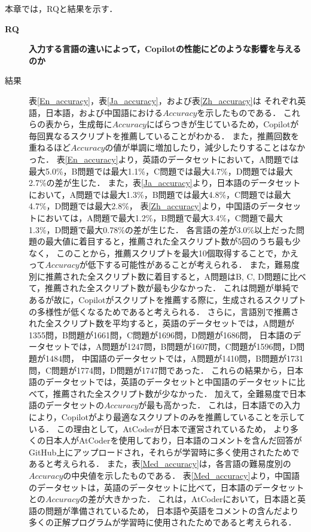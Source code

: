   本章では，RQと結果を示す．
  \begin{description}
    \item[\textbf{RQ}] \textbf{入力する言語の違いによって，Copilotの性能にどのような影響を与えるのか}
      \item[結果]
      
      表\ref{En_accuracy}，表\ref{Ja_accuracy}，および表\ref{Zh_accuracy}は
      それぞれ英語，日本語，および中国語における$Accuracy$を示したものである．
      これらの表から，生成毎に$Accuracy$にばらつきが生じているため，Copilotが毎回異なるスクリプトを推薦していることがわかる．
      また，推薦回数を重ねるほど$Accuracy$の値が単調に増加したり，減少したりすることはなかった．
      表\ref{En_accuracy}より，英語のデータセットにおいて，A問題では最大5.0\%，B問題では最大1.1\%，C問題では最大4.7\%，D問題では最大2.7\%の差が生じた．
      また，表\ref{Ja_accuracy}より，日本語のデータセットにおいて，A問題では最大1.3\%，B問題では最大4.8\%，C問題では最大4.7\%，D問題では最大2.8\%，
      表\ref{Zh_accuracy}より，中国語のデータセットにおいては，A問題で最大1.2\%，B問題で最大3.4\%，C問題で最大1.3\%，D問題で最大0.78\%の差が生じた．
      各言語の差が3.0\%以上だった問題の最大値に着目すると，推薦された全スクリプト数が5回のうち最も少なく，
      このことから，推薦スクリプトを最大10個取得することで，かえって$Accuracy$が低下する可能性があることが考えられる．
      また，難易度別に推薦された全スクリプト数に着目すると，A問題はB, C, D問題に比べて，推薦された全スクリプト数が最も少なかった．
      これは問題が単純であるが故に，Copilotがスクリプトを推薦する際に，生成されるスクリプトの多様性が低くなるためであると考えられる．
      さらに，言語別で推薦された全スクリプト数を平均すると，英語のデータセットでは，A問題が1355問，B問題が1661問，C問題が1696問，D問題が1686問，
      日本語のデータセットでは，A問題が1247問，B問題が1607問，C問題が1596問，D問題が1484問，
      中国語のデータセットでは，A問題が1410問，B問題が1731問，C問題が1774問，D問題が1747問であった．
      これらの結果から，日本語のデータセットでは，英語のデータセットと中国語のデータセットに比べて，推薦された全スクリプト数が少なかった．
      加えて，全難易度で日本語のデータセットの$Accuracy$が最も高かった．
      これは，日本語での入力により，Copilotがより最適なスクリプトのみを推薦していることを示している．
      この理由として，AtCoder\cite{AtCoder}が日本で運営されているため，
      より多くの日本人がAtCoderを使用しており，日本語のコメントを含んだ回答がGitHub上にアップロードされ，それらが学習時に多く使用されたためであると考えられる．      
      また，表\ref{Med_accuracy}は，各言語の難易度別の$Accuracy$の中央値を示したものである．   
      表\ref{Med_accuracy}より，中国語のデータセットは，英語のデータセットに比べて，日本語のデータセットとの$Accuracy$の差が大きかった．
      これは，AtCoder\cite{AtCoder}において，日本語と英語の問題が準備されているため，
      日本語や英語をコメントの含んだより多くの正解プログラムが学習時に使用されたためであると考えられる．


\end{description}
